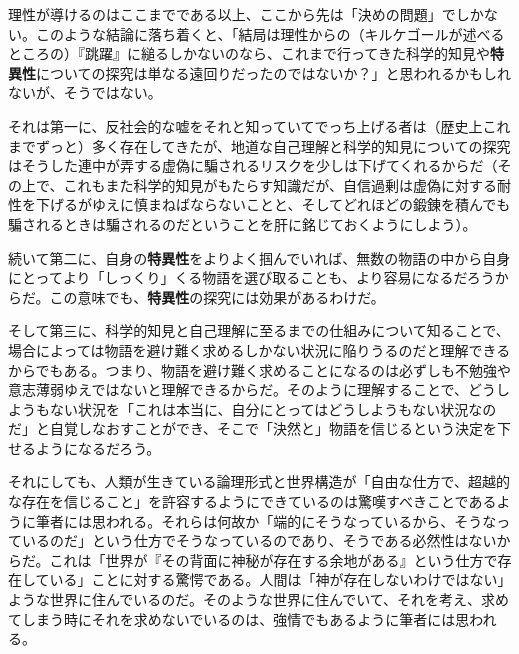 \documentclass[8pt, a5paper]{ltjsarticle}
\begin{document}
理性が導けるのはここまでである以上、ここから先は「決めの問題」でしかない。このような結論に落ち着くと、「結局は理性からの（キルケゴールが述べるところの）『跳躍』に縋るしかないのなら、これまで行ってきた科学的知見や\textbf{特異性}についての探究は単なる遠回りだったのではないか？」と思われるかもしれないが、そうではない。

それは第一に、反社会的な嘘をそれと知っていてでっち上げる者は（歴史上これまでずっと）多く存在してきたが、地道な自己理解と科学的知見についての探究はそうした連中が弄する虚偽に騙されるリスクを少しは下げてくれるからだ（その上で、これもまた科学的知見がもたらす知識だが、自信過剰は虚偽に対する耐性を下げるがゆえに慎まねばならないことと、そしてどれほどの鍛錬を積んでも騙されるときは騙されるのだということを肝に銘じておくようにしよう）。

続いて第二に、自身の\textbf{特異性}をよりよく掴んでいれば、無数の物語の中から自身にとってより「しっくり」くる物語を選び取ることも、より容易になるだろうからだ。この意味でも、\textbf{特異性}の探究には効果があるわけだ。

そして第三に、科学的知見と自己理解に至るまでの仕組みについて知ることで、場合によっては物語を避け難く求めるしかない状況に陥りうるのだと理解できるからでもある。つまり、物語を避け難く求めることになるのは必ずしも不勉強や意志薄弱ゆえではないと理解できるからだ。そのように理解することで、どうしようもない状況を「これは本当に、自分にとってはどうしようもない状況なのだ」と自覚しなおすことができ、そこで「決然と」物語を信じるという決定を下せるようになるだろう。

それにしても、人類が生きている論理形式と世界構造が「自由な仕方で、超越的な存在を信じること」を許容するようにできているのは驚嘆すべきことであるように筆者には思われる。それらは何故か「端的にそうなっているから、そうなっているのだ」という仕方でそうなっているのであり、そうである必然性はないからだ。これは「世界が『その背面に神秘が存在する余地がある』という仕方で存在している」ことに対する驚愕である。人間は「神が存在しないわけではない」ような世界に住んでいるのだ。そのような世界に住んでいて、それを考え、求めてしまう時にそれを求めないでいるのは、強情でもあるように筆者には思われる。
\end{document}
